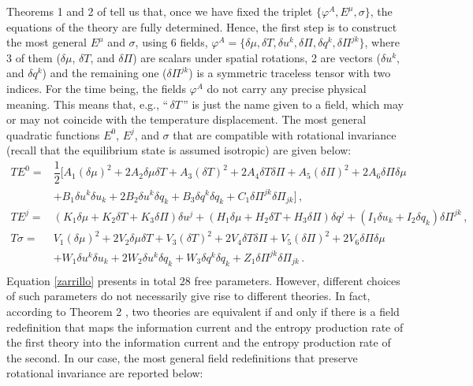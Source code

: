 \documentclass[a4paper, amsfonts, amssymb, amsmath, reprint, showkeys, nofootinbib, twoside, onecolumn,notitlepage]{revtex4-1}
\begin{document}
Theorems 1 and 2 of \cite{paperI} tell us that, once we have fixed the triplet $\{ \varphi^A,E^\mu,\sigma\}$, the equations of the theory are fully determined. Hence, the first step is to construct the most general $E^\mu$ and $\sigma$, using 6 fields, $\varphi^A =\{\delta \mu,\delta T ,\delta u^k,\delta \Pi,\delta q^k, \delta \Pi^{jk} \}$, where 3 of them ($\delta \mu$, $\delta T$, and $\delta \Pi$) are  scalars under spatial rotations, 2 are vectors ($\delta u^k$, and $\delta q^k$) and the remaining one ($\delta \Pi^{jk}$) is a symmetric traceless  tensor with two indices. For the time being, the fields $\varphi^A$ do not carry any precise physical meaning. This means that, e.g., ``$\, \delta T \,$'' is just the name given to a field, which may or may not coincide with the temperature displacement. The most general quadratic functions $E^0$, $E^j$, and $\sigma$ that are compatible with rotational invariance (recall that the equilibrium state is assumed isotropic) are given below:
\begin{equation}\label{zarrillo}
\begin{split}
TE^0={}& \dfrac{1}{2} \bigg[A_1 (\delta \mu)^2+2A_2 \delta \mu \delta T+A_3 (\delta T)^2+2A_4 \delta T \delta \Pi +A_5 (\delta \Pi)^2 +2A_6 \delta \Pi \delta \mu \\
 & + B_1 \delta u^k \delta u_k + 2 B_2 \delta u^k \delta q_k + B_3 \delta q^k \delta q_k + C_1 \delta \Pi^{jk} \delta \Pi_{jk} \bigg] \, ,  \\
TE^j={}& (K_1 \delta \mu +K_2 \delta T +K_3 \delta \Pi)\delta u^j +(H_1 \delta \mu +H_2 \delta T +H_3 \delta \Pi)\delta q^j + (I_1 \delta u_k +I_2 \delta q_k)\delta \Pi^{jk} \, ,  \\
T\sigma ={}& V_1 (\delta \mu)^2+2V_2 \delta \mu \delta T+V_3 (\delta T)^2+2V_4 \delta T \delta \Pi +V_5 (\delta \Pi)^2 +2V_6 \delta \Pi \delta \mu \\
 & + W_1 \delta u^k \delta u_k + 2 W_2 \delta u^k \delta q_k + W_3 \delta q^k \delta q_k + Z_1 \delta \Pi^{jk} \delta \Pi_{jk} \, . \\
\end{split}
\end{equation}
Equation \eqref{zarrillo} presents in total $28$ free parameters. However, different choices of such parameters do not necessarily give rise to different theories. In fact, according to Theorem 2 \cite{paperI}, two theories are equivalent if and only if there is a field redefinition that maps the information current and the entropy production rate of the first theory into the information current and the entropy production rate of the second. In our case, the most general field redefinitions that preserve rotational invariance are reported below:
\end{document}
